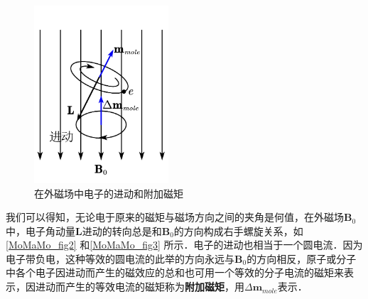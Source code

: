 \begin{figure}[ht]
\centering
\includegraphics[width=5cm]{./figures/MoMaMo_3.pdf}
\caption{在外磁场中电子的进动和附加磁矩} \label{MoMaMo_fig3}
\end{figure}

我们可以得知，无论电于原来的磁矩与磁场方向之间的夹角是何值，在外磁场$\mathbf B_0$中，电子角动量$\mathbf L$进动的转向总是和$\mathbf B_0$的方向构成右手螺旋关系，如\autoref{MoMaMo_fig2} 和\autoref{MoMaMo_fig3} 所示．电子的进动也相当于一个圆电流．因为电子带负电，这种等效的圆电流的此举的方向永远与$\mathbf B_0$的方向相反，原子或分子中各个电子因进动而产生的磁效应的总和也可用一个等效的分子电流的磁矩来表示，因进动而产生的等效电流的磁矩称为\textbf{附加磁矩}，用$\Delta\mathbf m_{mole}$表示．
